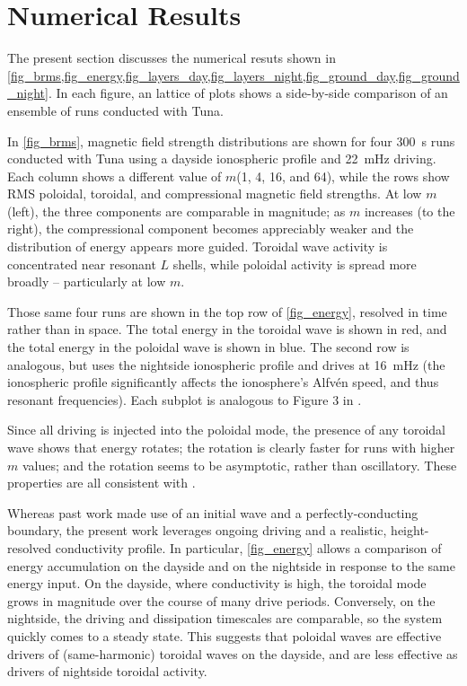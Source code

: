 \documentclass{article}
\newcommand{\Alfven}{Alfv\'en\xspace}
\newcommand{\azm}{\ensuremath{m}\xspace}
\begin{document}
\section{Numerical Results}

The present section discusses the numerical resuts shown in \cref{fig_brms,fig_energy,fig_layers_day,fig_layers_night,fig_ground_day,fig_ground_night}. In each figure, an lattice of plots shows a side-by-side comparison of an ensemble of runs conducted with Tuna.

In \cref{fig_brms}, magnetic field strength distributions are shown for four \SI{300}{\second} runs conducted with Tuna using a dayside ionospheric profile and \SI{22}{\mHz} driving. Each column shows a different value of \azm (1, 4, 16, and 64), while the rows show RMS poloidal, toroidal, and compressional magnetic field strengths. At low \azm (left), the three components are comparable in magnitude; as \azm increases (to the right), the compressional component becomes appreciably weaker and the distribution of energy appears more guided. Toroidal wave activity is concentrated near resonant $L$ shells, while poloidal activity is spread more broadly -- particularly at low \azm.

Those same four runs are shown in the top row of \cref{fig_energy}, resolved in time rather than in space. The total energy in the toroidal wave is shown in red, and the total energy in the poloidal wave is shown in blue. The second row is analogous, but uses the nightside ionospheric profile and drives at \SI{16}{\mHz} (the ionospheric profile significantly affects the ionosphere's \Alfven speed, and thus resonant frequencies). Each subplot is analogous to Figure 3 in \cite{mann_1995}.

Since all driving is injected into the poloidal mode, the presence of any toroidal wave shows that energy rotates; the rotation is clearly faster for runs with higher \azm values; and the rotation seems to be asymptotic, rather than oscillatory. These properties are all consistent with \cite{mann_1995}.

Whereas past work made use of an initial wave and a perfectly-conducting boundary, the present work leverages ongoing driving and a realistic, height-resolved conductivity profile. In particular, \cref{fig_energy} allows a comparison of energy accumulation on the dayside and on the nightside in response to the same energy input. On the dayside, where conductivity is high, the toroidal mode grows in magnitude over the course of many drive periods. Conversely, on the nightside, the driving and dissipation timescales are comparable, so the system quickly comes to a steady state. This suggests that poloidal waves are effective drivers of (same-harmonic) toroidal waves on the dayside, and are less effective as drivers of nightside toroidal activity.
\end{document}
